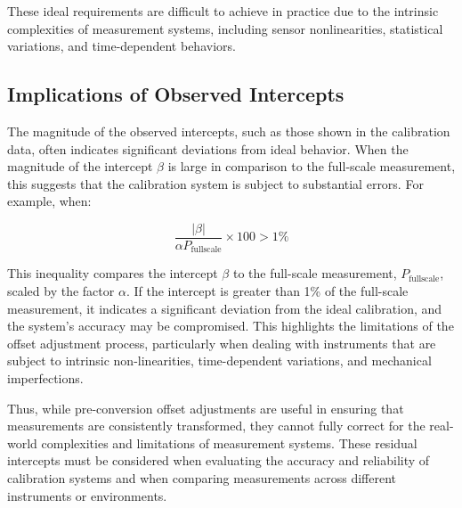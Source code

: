 \documentclass{article}
\begin{document}
These ideal requirements are difficult to achieve in practice due to the intrinsic complexities of measurement systems, including sensor nonlinearities, statistical variations, and time-dependent behaviors.

\subsection{Implications of Observed Intercepts}
The magnitude of the observed intercepts, such as those shown in the calibration data, often indicates significant deviations from ideal behavior. When the magnitude of the intercept \( \beta \) is large in comparison to the full-scale measurement, this suggests that the calibration system is subject to substantial errors. For example, when:

\[
\frac{|\beta|}{\alpha P_{\text{fullscale}}} \times 100 > 1\%
\]

This inequality compares the intercept \( \beta \) to the full-scale measurement, \( P_{\text{fullscale}} \), scaled by the factor \( \alpha \). If the intercept is greater than 1\% of the full-scale measurement, it indicates a significant deviation from the ideal calibration, and the system's accuracy may be compromised. This highlights the limitations of the offset adjustment process, particularly when dealing with instruments that are subject to intrinsic non-linearities, time-dependent variations, and mechanical imperfections.

Thus, while pre-conversion offset adjustments are useful in ensuring that measurements are consistently transformed, they cannot fully correct for the real-world complexities and limitations of measurement systems. These residual intercepts must be considered when evaluating the accuracy and reliability of calibration systems and when comparing measurements across different instruments or environments.
\end{document}
